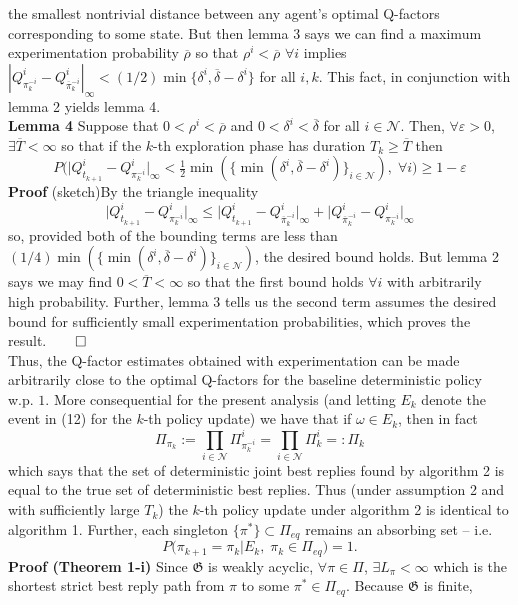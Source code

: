 \documentclass[10pt]{article}
\newcommand{\1}[1]{\mathbbm{1}_{#1}}
\newcommand{\mc}[1]{\mathcal{#1}}
\begin{document}
the smallest nontrivial distance between any agent's optimal Q-factors corresponding to some state. But then lemma 3 says we can find a maximum experimentation probability $\overline{\rho}$ so that $\rho^i<\overline{\rho}$ $\forall i$ implies $|Q^i_{\pi^{-i}_k}-Q^i_{\overline{\pi}^{-i}_k}|_\infty<(1/2)\min\{\delta^i,\overline{\delta}-\delta^i\}$ for all $i,k$. This fact, in conjunction with lemma 2 yields lemma 4.\\[5pt]
{\bf Lemma 4}\hspace{5pt} Suppose that $0<\rho^i<\overline{\rho}$ and $0<\delta^i<\overline{\delta}$ for all $i\in\mc{N}$. Then, $\forall\varepsilon>0$, $\exists\overline{T}<\infty$ so that if the $k$-th exploration phase has duration $T_k\geq \overline{T}$ then
\[P\big(\big|Q^i_{t_{k+1}}-Q^i_{\pi^{-i}_k}\big|_\infty<\tfrac{1}{2}\min(\{\min(\delta^i,\overline{\delta}-\delta^i)\}_{i\in\mc{N}}),\;\forall i\big)\geq1-\varepsilon\tag{12}\]
{\bf Proof} (sketch)\hspace{5pt}By the triangle inequality
\[\big|Q^i_{t_{k+1}}-Q^i_{\pi^{-i}_k}\big|_\infty\leq \big|Q^i_{t_{k+1}}-Q^i_{\overline{\pi}^{-i}_k}\big|_\infty+\big|Q^i_{\overline{\pi}^{-i}_k}-Q^i_{\pi^{-i}_k}\big|_\infty\]
so, provided both of the bounding terms are less than $(1/4)\min(\{\min(\delta^i,\overline{\delta}-\delta^i)\}_{i\in\mc{N}})$, the desired bound holds. But lemma 2 says we may find $0<\overline{T}<\infty$ so that the first bound holds $\forall i$ with arbitrarily high probability. Further, lemma 3 tells us the second term assumes the desired bound for sufficiently small experimentation probabilities, which proves the result.\hfill{$\qed$}\\[5pt]
Thus, the Q-factor estimates obtained with experimentation can be made arbitrarily close to the optimal Q-factors for the baseline deterministic policy w.p. $1$. More consequential for the present analysis (and letting $E_k$ denote the event in (12) for the $k$-th policy update) we have that if $\omega\in E_k$, then in fact
\[\Pi_{\pi_k}:=\prod_{i\in\mc{N}}\Pi^i_{\pi^{-i}_k}=\prod_{i\in\mc{N}}\Pi^i_k=:\Pi_k\tag{13}\]
which says that the set of deterministic joint best replies found by algorithm 2 is equal to the true set of deterministic best replies. Thus (under assumption 2 and with sufficiently large $T_k$) the $k$-th policy update under algorithm 2 is identical to algorithm 1. Further, each singleton $\{\pi^\ast\}\subset\Pi_{eq}$ remains an absorbing set -- i.e.
\[P\big(\pi_{k+1}=\pi_k|E_k,\;\pi_k\in\Pi_{eq}\big)=1.\tag{14}\]
{\bf Proof (Theorem 1-i)}\hspace{5pt} Since $\mathfrak{G}$ is weakly acyclic, $\forall\pi\in\Pi$, $\exists L_\pi<\infty$ which is the shortest strict best reply path from $\pi$ to some $\pi^\ast\in\Pi_{eq}$. Because $\mathfrak{G}$ is finite,
\end{document}
